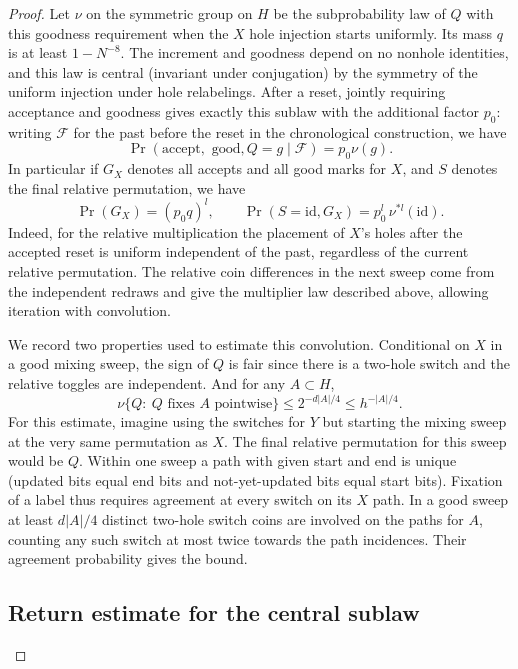 \begin{proof}
Let \(\nu\) on the symmetric group on \(H\) be the subprobability law of \(Q\) with this goodness requirement when the \(X\) hole injection starts uniformly. Its mass \(q\) is at least \(1-N^{-8}\). The increment and goodness depend on no nonhole identities, and this law is central (invariant under conjugation) by the symmetry of the uniform injection under hole relabelings. After a reset, jointly requiring acceptance and goodness gives exactly this sublaw with the additional factor \(p_0\): writing \(\mathcal F\) for the past before the reset in the chronological construction, we have
\[
\Pr(\text{accept},\text{ good},Q=g\mid \mathcal F)=p_0\nu(g).
\]
In particular if \(G_X\) denotes all accepts and all good marks for \(X\), and \(S\) denotes the final relative permutation, we have
\[
\Pr(G_X)=(p_0 q)^l,\qquad
\Pr(S=\mathrm{id},G_X)=p_0^l\,\nu^{*l}(\mathrm{id}).
\]
Indeed, for the relative multiplication the placement of \(X\)'s holes after the accepted reset is uniform independent of the past, regardless of the current relative permutation. The relative coin differences in the next sweep come from the independent redraws and give the multiplier law described above, allowing iteration with convolution.

We record two properties used to estimate this convolution. Conditional on \(X\) in a good mixing sweep, the sign of \(Q\) is fair since there is a two-hole switch and the relative toggles are independent. And for any \(A\subset H\),
\[
\nu\{Q:\ Q\text{ fixes } A \text{ pointwise}\}\le 2^{-d|A|/4}\le h^{-|A|/4}.
\]
For this estimate, imagine using the switches for \(Y\) but starting the mixing sweep at the very same permutation as \(X\). The final relative permutation for this sweep would be \(Q\). Within one sweep a path with given start and end is unique (updated bits equal end bits and not-yet-updated bits equal start bits). Fixation of a label thus requires agreement at every switch on its \(X\) path. In a good sweep at least \(d|A|/4\) distinct two-hole switch coins are involved on the paths for \(A\), counting any such switch at most twice towards the path incidences. Their agreement probability gives the bound.

\subsection{Return estimate for the central sublaw}


\end{proof}
